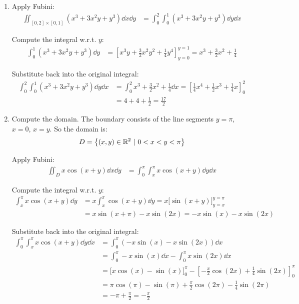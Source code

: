 \documentclass[12pt]{article}
\begin{document}
\begin{enumerate}
    \item Apply Fubini:
    $$
    \begin{aligned}
        \iint_{[0, 2] \times [0, 1]} \left( x^3 + 3x^2y +y^3 \right) \dd x \dd y &= \int_{0}^{2} \int_{0}^{1} \left( x^3 + 3x^2y +y^3 \right) \dd y \dd x
    \end{aligned}
    $$

    Compute the integral w.r.t. $y$:
    $$
    \begin{aligned}
        \int_{0}^{1} \left( x^3 + 3x^2y +y^3 \right) \dd y &= \left[x^3y + \frac{3}{2}x^2y^2 + \frac{1}{4}y^4\right]_{y = 0}^{y = 1} = x^3 + \frac{3}{2}x^2 + \frac{1}{4}
    \end{aligned}
    $$

    Substitute back into the original integral:
    $$
    \begin{aligned}
        \int_{0}^{2} \int_{0}^{1} \left( x^3 + 3x^2y +y^3 \right) \dd y \dd x &= \int_{0}^{2} x^3 + \frac{3}{2}x^2 + \frac{1}{4} \dd x = \left[ \frac{1}{4}x^4 + \frac{1}{2}x^3 + \frac{1}{4}x \right]_0^2 \\
        &= 4 + 4 + \frac{1}{2} = \boxed{\frac{17}{2}}
    \end{aligned}
    $$

    \item Compute the domain. The boundary consists of the line segments $y = \pi$, $x = 0$, $x = y$. So the domain is:
    $$
        D = \left\{ (x, y) \in \mathbb{R}^2 \ |\ 0 < x < y < \pi  \right\}
    $$
    
    Apply Fubini:
    $$
        \begin{aligned}
            \iint_D x\cos(x + y) \dd x \dd y &= \int_{0}^{\pi} \int_{x}^{\pi} x \cos(x + y) \dd y \dd x
        \end{aligned}
    $$

    Compute the integral w.r.t. $y$:
    $$
        \begin{aligned}
            \int_{x}^{\pi} x \cos(x + y) \dd y &= x \int_{x}^{\pi} \cos(x + y) \dd y = x \big[ \sin(x + y) \big]_{y = x}^{y = \pi} \\
            &= x\sin(x + \pi) - x\sin(2x) = -x\sin(x) -x\sin(2x)
        \end{aligned}
    $$

    Substitute back into the original integral:
    $$
        \begin{aligned}
            \int_{0}^{\pi} \int_{x}^{\pi} x \cos(x + y) \dd y \dd x &= \int_{0}^{\pi} \left(-x\sin(x) -x\sin(2x)\right) \dd x \\
            &= \int_{0}^{\pi} -x\sin(x) \dd x - \int_{0}^{\pi} x\sin(2x)\dd x \\
            &= \bigg[ x\cos(x) - \sin(x) \bigg]_0^\pi - \left[ -\frac{x}{2}\cos(2x) +\frac{1}{4} \sin(2x) \right]_0^\pi \\
            &= \pi\cos(\pi) - \sin(\pi) + \frac{\pi}{2}\cos(2\pi) - \frac{1}{4}\sin(2\pi) \\
            &= -\pi + \frac{\pi}{2} = \boxed{-\frac{\pi}{2}}
        \end{aligned}
    $$


\end{enumerate}
\end{document}
